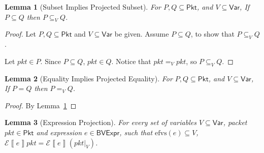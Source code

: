 \documentclass{article}
\newcommand{\pkt}{\mathit{pkt}}
\newcommand{\denote}[1]{\left\llbracket#1\right\rrbracket}
\newcommand{\edenote}[1]{\mathcal{E}\denote{#1}}
\newcommand{\BVExpr}{\mathsf{BVExpr}}
\newcommand{\Pkt}{\mathsf{Pkt}}
\newcommand{\Var}{\mathsf{Var}}
\newcommand{\efvs}{\textrm{efvs}}
\newtheorem{lemma}{Lemma}
\begin{document}
\begin{lemma}[Subset Implies Projected Subset]
  \label{lem:subset-proj}
  For $P,Q \subseteq \Pkt$, and $ V \subseteq \Var$,
  If $P \subseteq Q$ then $P \subseteq_V Q$.
\end{lemma}

\begin{proof}
Let $P,Q \subseteq \Pkt$ and $V \subseteq \Var$ be given. Assume $P \subseteq Q$,
to show that $P \subseteq_V Q$.

Let $\pkt \in P$. Since $P \subseteq Q$, $\pkt \in Q$. Notice that $\pkt =_V
\pkt$, so $P \subseteq_V Q$.
\end{proof}

\begin{lemma}[Equality Implies Projected Equality]
  \label{lem:equal-proj}
  For $P,Q \subseteq \Pkt$, and $ V \subseteq \Var$,
  If $P = Q$ then $P =_V Q$.
\end{lemma}

\begin{proof}
  By Lemma~\ref{lem:subset-proj}
\end{proof}

\begin{lemma}[Expression Projection]
  \label{lem:proj-expr}
  For every set of variables $V \subseteq \Var$, packet $\pkt \in \Pkt$ and
  expression $e \in \BVExpr$, such that $\efvs(e) \subseteq V$, $\edenote{e}\pkt =
  \edenote{e}(\pkt|_V)$.
\end{lemma}
\end{document}
